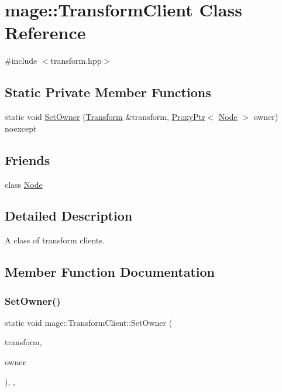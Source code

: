\hypertarget{classmage_1_1_transform_client}{}\section{mage\+:\+:Transform\+Client Class Reference}
\label{classmage_1_1_transform_client}


{\ttfamily \#include $<$transform.\+hpp$>$}

\subsection*{Static Private Member Functions}
\begin{DoxyCompactItemize}
\item 
static void \hyperlink{classmage_1_1_transform_client_a2aa5a5d9d95b161f6673409cc11e1e1c}{Set\+Owner} (\hyperlink{classmage_1_1_transform}{Transform} \&transform, \hyperlink{classmage_1_1_proxy_ptr}{Proxy\+Ptr}$<$ \hyperlink{classmage_1_1_node}{Node} $>$ owner) noexcept
\end{DoxyCompactItemize}
\subsection*{Friends}
\begin{DoxyCompactItemize}
\item 
class \hyperlink{classmage_1_1_transform_client_a6db9d28bd448a131448276ee03de1e6d}{Node}
\end{DoxyCompactItemize}


\subsection{Detailed Description}
A class of transform clients. 

\subsection{Member Function Documentation}
\hypertarget{classmage_1_1_transform_client_a2aa5a5d9d95b161f6673409cc11e1e1c}{}\label{classmage_1_1_transform_client_a2aa5a5d9d95b161f6673409cc11e1e1c} 
\subsubsection{\texorpdfstring{Set\+Owner()}{SetOwner()}}
{\footnotesize\ttfamily static void mage\+::\+Transform\+Client\+::\+Set\+Owner (\begin{DoxyParamCaption}\item[{\hyperlink{classmage_1_1_transform}{Transform} \&}]{transform,  }\item[{\hyperlink{classmage_1_1_proxy_ptr}{Proxy\+Ptr}$<$ \hyperlink{classmage_1_1_node}{Node} $>$}]{owner }\end{DoxyParamCaption})\hspace{0.3cm}{\ttfamily [static]}, {\ttfamily [private]}, {\ttfamily [noexcept]}}

